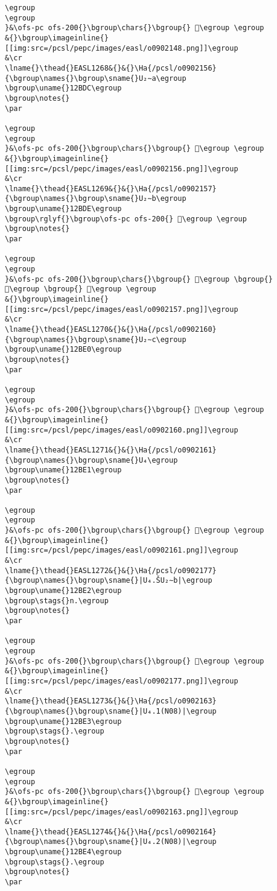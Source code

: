 \begin{verbatim}
\egroup
\egroup
}&\ofs-pc ofs-200{}\bgroup\chars{}\bgroup{} 𒯛\egroup \egroup
&{}\bgroup\imageinline{}[[img:src=/pcsl/pepc/images/easl/o0902148.png]]\egroup
&\cr
\lname{}\thead{}EASL1268&{}&{}\Ha{/pcsl/o0902156}{\bgroup\names{}\bgroup\sname{}U₂∼a\egroup
\bgroup\uname{}12BDC\egroup
\bgroup\notes{}
\par 

\egroup
\egroup
}&\ofs-pc ofs-200{}\bgroup\chars{}\bgroup{} 𒯜\egroup \egroup
&{}\bgroup\imageinline{}[[img:src=/pcsl/pepc/images/easl/o0902156.png]]\egroup
&\cr
\lname{}\thead{}EASL1269&{}&{}\Ha{/pcsl/o0902157}{\bgroup\names{}\bgroup\sname{}U₂∼b\egroup
\bgroup\uname{}12BDE\egroup
\bgroup\rglyf{}\bgroup\ofs-pc ofs-200{} 𒯞\egroup \egroup
\bgroup\notes{}
\par 

\egroup
\egroup
}&\ofs-pc ofs-200{}\bgroup\chars{}\bgroup{} 𒯝\egroup \bgroup{} 𒯞\egroup \bgroup{} 𒯟\egroup \egroup
&{}\bgroup\imageinline{}[[img:src=/pcsl/pepc/images/easl/o0902157.png]]\egroup
&\cr
\lname{}\thead{}EASL1270&{}&{}\Ha{/pcsl/o0902160}{\bgroup\names{}\bgroup\sname{}U₂∼c\egroup
\bgroup\uname{}12BE0\egroup
\bgroup\notes{}
\par 

\egroup
\egroup
}&\ofs-pc ofs-200{}\bgroup\chars{}\bgroup{} 𒯠\egroup \egroup
&{}\bgroup\imageinline{}[[img:src=/pcsl/pepc/images/easl/o0902160.png]]\egroup
&\cr
\lname{}\thead{}EASL1271&{}&{}\Ha{/pcsl/o0902161}{\bgroup\names{}\bgroup\sname{}U₄\egroup
\bgroup\uname{}12BE1\egroup
\bgroup\notes{}
\par 

\egroup
\egroup
}&\ofs-pc ofs-200{}\bgroup\chars{}\bgroup{} 𒯡\egroup \egroup
&{}\bgroup\imageinline{}[[img:src=/pcsl/pepc/images/easl/o0902161.png]]\egroup
&\cr
\lname{}\thead{}EASL1272&{}&{}\Ha{/pcsl/o0902177}{\bgroup\names{}\bgroup\sname{}|U₄.ŠU₂∼b|\egroup
\bgroup\uname{}12BE2\egroup
\bgroup\stags{}n.\egroup
\bgroup\notes{}
\par 

\egroup
\egroup
}&\ofs-pc ofs-200{}\bgroup\chars{}\bgroup{} 𒯢\egroup \egroup
&{}\bgroup\imageinline{}[[img:src=/pcsl/pepc/images/easl/o0902177.png]]\egroup
&\cr
\lname{}\thead{}EASL1273&{}&{}\Ha{/pcsl/o0902163}{\bgroup\names{}\bgroup\sname{}|U₄.1(N08)|\egroup
\bgroup\uname{}12BE3\egroup
\bgroup\stags{}.\egroup
\bgroup\notes{}
\par 

\egroup
\egroup
}&\ofs-pc ofs-200{}\bgroup\chars{}\bgroup{} 𒯣\egroup \egroup
&{}\bgroup\imageinline{}[[img:src=/pcsl/pepc/images/easl/o0902163.png]]\egroup
&\cr
\lname{}\thead{}EASL1274&{}&{}\Ha{/pcsl/o0902164}{\bgroup\names{}\bgroup\sname{}|U₄.2(N08)|\egroup
\bgroup\uname{}12BE4\egroup
\bgroup\stags{}.\egroup
\bgroup\notes{}
\par 


\end{verbatim}
